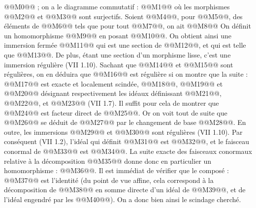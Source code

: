 
@@M0@@ ; on a le diagramme commutatif :
@@M1@@
où les morphismes @@M2@@ et @@M3@@ sont surjectifs. Soient @@M4@@, pour @@M5@@, des éléments de @@M6@@ tels que pour tout @@M7@@, on ait
@@M8@@
On définit un homomorphisme @@M9@@ en posant @@M10@@. On obtient ainsi une immersion fermée @@M11@@ qui est une section de @@M12@@, et qui est telle que @@M13@@. De plus, étant une section d'un morphisme lisse, c'est une immersion régulière (VII 1.10). Sachant que @@M14@@ et @@M15@@ sont régulières, on en déduira que @@M16@@ est régulière si on montre que la suite :
@@M17@@
est exacte et localement scindée, @@M18@@, @@M19@@ et @@M20@@ désignant respectivement les idéaux définissant @@M21@@, @@M22@@, et @@M23@@ (VII 1.7). Il suffit pour cela de montrer que @@M24@@ est facteur direct de @@M25@@. Or on voit tout de suite que @@M26@@ se déduit de @@M27@@ par le changement de base @@M28@@. En outre, les immersions @@M29@@ et @@M30@@ sont régulières (VII 1.10). Par conséquent (VII 1.2), l'idéal qui définit @@M31@@ est @@M32@@, et le faisceau conormal de @@M33@@ est @@M34@@. La suite exacte des faisceaux conormaux relative à la décomposition @@M35@@ donne donc en particulier un homomorphisme : @@M36@@. Il est immédiat de vérifier que le composé : @@M37@@ est l'identité (du point de vue affine, cela correspond à la décomposition de @@M38@@ en somme directe d'un idéal de @@M39@@, et de l'idéal engendré par les @@M40@@). On a donc bien ainsi le scindage cherché.


